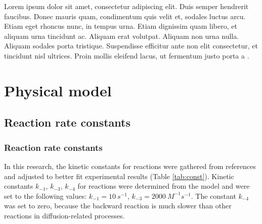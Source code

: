 Lorem ipsum dolor sit amet, consectetur adipiscing elit. Duis semper hendrerit faucibus. Donec mauris quam, condimentum quis velit et, sodales luctus arcu. Etiam eget rhoncus nunc, in tempus urna. Etiam dignissim quam libero, et aliquam urna tincidunt ac. Aliquam erat volutpat. Aliquam non urna nulla. Aliquam sodales porta tristique. Suspendisse efficitur ante non elit consectetur, et tincidunt nisl ultrices. Proin mollis eleifend lacus, ut fermentum justo porta a \cite{smotkin1991dioxygen, bard2012scanning}.

\section{Physical model} \label{sec:reakc_phys}

\subsection{Reaction rate constants}  \label{subs:reakc_const}

\subsubsection{Reaction rate constants}  \label{subs:reakc_const2}

In this research, the kinetic constants for reactions were gathered from references  and adjusted to better fit experimental results (Table \ref{tab:const}). Kinetic constants $k_{-1}$, $k_{-3}$, $k_{-4}$ for reactions were determined from the model and were set to the following values: $k_{-1} = \SI{10}{s^{-1}}$, $k_{-3} = \SI{2000}{M^{-1}s^{-1}}$. The constant $k_{-4}$ was set to zero, because the backward reaction is much slower than other reactions in diffusion-related processes. 

